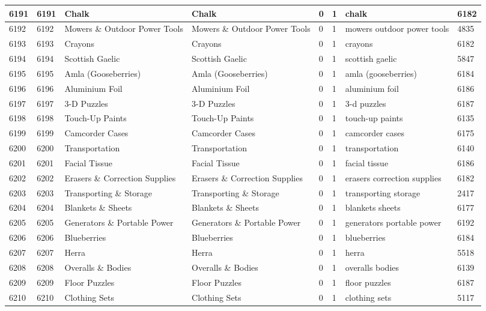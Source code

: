 \begin{longtable}{|l|l|l|l|l|l|l|l|}
6191 & 6191 & Chalk & Chalk & 0 & 1 & chalk & 6182 \\ \hline 
6192 & 6192 & Mowers \& Outdoor Power Tools & Mowers \& Outdoor Power Tools & 0 & 1 & mowers outdoor power tools & 4835 \\ \hline 
6193 & 6193 & Crayons & Crayons & 0 & 1 & crayons & 6182 \\ \hline 
6194 & 6194 & Scottish Gaelic & Scottish Gaelic & 0 & 1 & scottish gaelic & 5847 \\ \hline 
6195 & 6195 & Amla (Gooseberries) & Amla (Gooseberries) & 0 & 1 & amla (gooseberries) & 6184 \\ \hline 
6196 & 6196 & Aluminium Foil & Aluminium Foil & 0 & 1 & aluminium foil & 6186 \\ \hline 
6197 & 6197 & 3-D Puzzles & 3-D Puzzles & 0 & 1 & 3-d puzzles & 6187 \\ \hline 
6198 & 6198 & Touch-Up Paints & Touch-Up Paints & 0 & 1 & touch-up paints & 6135 \\ \hline 
6199 & 6199 & Camcorder Cases & Camcorder Cases & 0 & 1 & camcorder cases & 6175 \\ \hline 
6200 & 6200 & Transportation & Transportation & 0 & 1 & transportation & 6140 \\ \hline 
6201 & 6201 & Facial Tissue & Facial Tissue & 0 & 1 & facial tissue & 6186 \\ \hline 
6202 & 6202 & Erasers \& Correction Supplies & Erasers \& Correction Supplies & 0 & 1 & erasers correction supplies & 6182 \\ \hline 
6203 & 6203 & Transporting \& Storage & Transporting \& Storage & 0 & 1 & transporting storage & 2417 \\ \hline 
6204 & 6204 & Blankets \& Sheets & Blankets \& Sheets & 0 & 1 & blankets sheets & 6177 \\ \hline 
6205 & 6205 & Generators \& Portable Power & Generators \& Portable Power & 0 & 1 & generators portable power & 6192 \\ \hline 
6206 & 6206 & Blueberries & Blueberries & 0 & 1 & blueberries & 6184 \\ \hline 
6207 & 6207 & Herra & Herra & 0 & 1 & herra & 5518 \\ \hline 
6208 & 6208 & Overalls \& Bodies & Overalls \& Bodies & 0 & 1 & overalls bodies & 6139 \\ \hline 
6209 & 6209 & Floor Puzzles & Floor Puzzles & 0 & 1 & floor puzzles & 6187 \\ \hline 
6210 & 6210 & Clothing Sets & Clothing Sets & 0 & 1 & clothing sets & 5117 \\ \hline 

\end{longtable}
